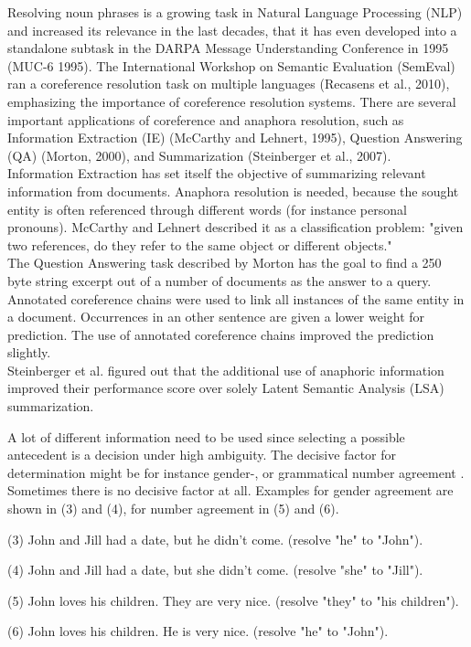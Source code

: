 Resolving noun phrases is a growing task in Natural Language Processing (NLP) and increased its relevance in the last decades, that it has even developed into a standalone subtask in the DARPA Message Understanding Conference in 1995 (MUC-6 1995). The International Workshop on Semantic Evaluation (SemEval) ran a coreference resolution task on multiple languages (Recasens et al., 2010), emphasizing the importance of coreference resolution systems. 
There are several important applications of coreference and anaphora resolution, such as Information Extraction (IE) (McCarthy and Lehnert, 1995), Question Answering (QA) (Morton, 2000), and Summarization (Steinberger et al., 2007).\\ 
Information Extraction has set itself the objective of summarizing relevant information from documents. Anaphora resolution is needed, because the sought entity is often referenced through different words (for instance personal pronouns). McCarthy and Lehnert described it as a classification problem: "given two references, do they refer to the same object or different objects."\\
The Question Answering task described by Morton has the goal to find a 250 byte string excerpt out of a number of documents as the answer to a query. Annotated coreference chains were used to link all instances of the same entity in a document. Occurrences in an other sentence are given a lower weight for prediction. The use of annotated coreference chains improved the prediction slightly.\\
Steinberger et al. figured out that the additional use of anaphoric information improved their performance score over solely Latent Semantic Analysis (LSA) summarization.

A lot of different information need to be used since selecting a possible antecedent is a decision under high ambiguity. The decisive factor for determination might be for instance gender-, or grammatical number agreement . Sometimes there is no decisive factor at all. Examples for gender agreement are shown in (3) and (4), for number agreement in (5) and (6).

(3) John and Jill had a date, but he didn't come. (resolve "he" to "John").

(4) John and Jill had a date, but she didn't come. (resolve "she" to "Jill").

(5) John loves his children. They are very nice. (resolve "they" to "his children").

(6) John loves his children. He is very nice. (resolve "he" to "John").


